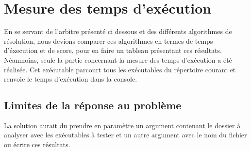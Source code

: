\documentclass[11pt]{article}
\begin{document}
	\section{Mesure des temps d'exécution}
	\label{section:mesure_des_temps_d_execution}

	En se servant de l'arbitre présenté ci dessous et des différents algorithmes de résolution, nous devions comparer ces algorithmes en termes de temps d'éxecution et de score, pour en faire un tableau présentant ces résultats. Néanmoins, seule la partie concernant la mesure des temps d'exécution a été réalisée. Cet exécutable parcourt tous les exécutables du répertoire courant et renvoie le temps d'exécution dans la console.

	\subsection{Limites de la réponse au problème}
	\label{subsection:travail_pas_fait}

	La solution aurait du prendre en paramètre un argument contenant le dossier à analyser avec les exécutables à tester et un autre argument avec le nom du fichier ou écrire ces résultats. 
	

\end{document}
